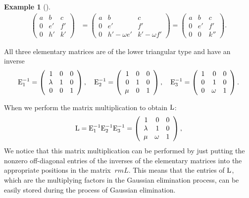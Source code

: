\documentclass[
  a4paper,
  DIV=11,
  numbers=noendperiod,
  oneside]{scrreprt}
\theoremstyle{definition}
\newtheorem{example}{Example}[chapter]
\theoremstyle{remark}
\begin{document}
\begin{example}[]
\[\begin{aligned}
\left(\begin{array}{rrr}
a & b & c\\
0 & e' & f' \\
0 & h' & k'
\end{array}\right) &=
\left(\begin{array}{rrr}
a & b & c \\
0 & e' & f' \\
0 & h'-\omega e' & k'-\omega f'
\end{array}\right) =
\left(\begin{array}{rrr}
a & b & c \\
0 & e' & f' \\
0 & 0 & k''
\end{array}\right).
\end{aligned}\]

All three elementary matrices are of the lower triangular type and have
an inverse \[{\rm E}_1^{-1} =\left(
{{\begin{array}{rrr}
 1  & 0  & 0  \\
 {\lambda }  & 1  & 0  \\
 0  & 0  & 1  \\
\end{array} }} \right), \quad  {\rm E}_2^{-1} =\left(
{{\begin{array}{rrr}
 1  & 0  & 0  \\
 0  & 1  & 0  \\
 {\mu }  & 0  & 1  \\
\end{array} }} \right), \quad   {\rm E}_3^{-1} =\left( 
\begin{array}{rrr}
 1  & 0  & 0  \\
 0  & 1  & 0  \\
 0  &  \omega  & 1  \\
\end{array} \right)  .\]

When we perform the matrix multiplication to obtain \({\rm L}\):
\[{\rm L} ={\rm E}_{1}^{-1}  {\rm E}_{2}^{- 1} {\rm E}_{3}^{-1}  =\left(
\begin{array}{rrr}
 1  & 0  & 0  \\
 \lambda & 1  & 0  \\
 \mu &  \omega  & 1  \\
\end{array} \right),\] We notice that this matrix multiplication can be
performed by just putting the nonzero off-diagonal entries of the
inverses of the elementary matrices into the appropriate positions in
the matrix \({\ rm L}\). This means that the entries of \({\rm L}\),
which are the multiplying factors in the Gaussian elimination process,
can be easily stored during the process of Gaussian elimination.


\end{example}
\end{document}
